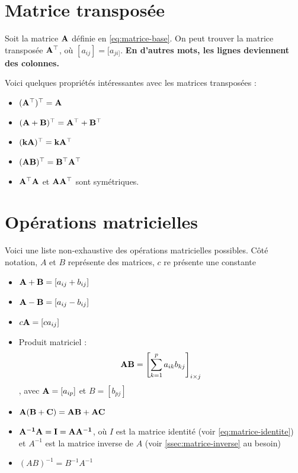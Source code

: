 \documentclass[12pt, french]{report}
\begin{document}
\section{Matrice transposée} Soit la matrice $\mathbf{A}$ définie en \eqref{eq:matrice-base}. On peut trouver la matrice transposée $\mathbf{A^{\top}}$, où $[a_{ij}] = [a_{ji]}$. \textbf{En d'autres mots, les lignes deviennent des colonnes.}

Voici quelques propriétés intéressantes avec les matrices transposées : 
\begin{itemize}
  \item $\mathbf{(A^\top)^\top = A}$
  \item $\mathbf{(A+B)^\top = A^\top + B^\top}$
  \item $\mathbf{(kA)^\top = kA^\top}$
  \item $\mathbf{(AB)^\top = B^\top A^\top}$
  \item $\mathbf{A^\top A}$ et $\mathbf{A A^\top}$ sont symétriques.
\end{itemize}

\section{Opérations matricielles} Voici une liste non-exhaustive des opérations matricielles possibles. Côté notation, $A$ et $B$ représente des matrices, $c$ re présente une constante
\begin{itemize}
\item $\mathbf{A + B}  = [a_{ij} + b_{ij}]$
\item $\mathbf{A - B}  = [a_{ij} - b_{ij}]$
\item $c\mathbf{A}   = [ca_{ij}]$
\item Produit matriciel :
\begin{equation}
\label{eq:produit-matriciel}
\mathbf{AB}   = \left[ \sum_{k=1}^p a_{ik} b_{kj}  \right]_{i \times j}
\end{equation}
,  avec $\mathbf{A}=[a_{ip}]$ et $B = [b_{pj}]$
\item $\mathbf{A(B +C) = AB + AC}$
\item $\mathbf{A^{-1} A = I =A A^{-1}}$, où $I$ est la matrice identité (voir \autoref{eq:matrice-identite}) et $A^{-1}$ est la matrice inverse de $A$ (voir \autoref{ssec:matrice-inverse} au besoin)
\item $(AB)^{-1} = B^{-1} A^{-1}$
\end{itemize}
\end{document}
